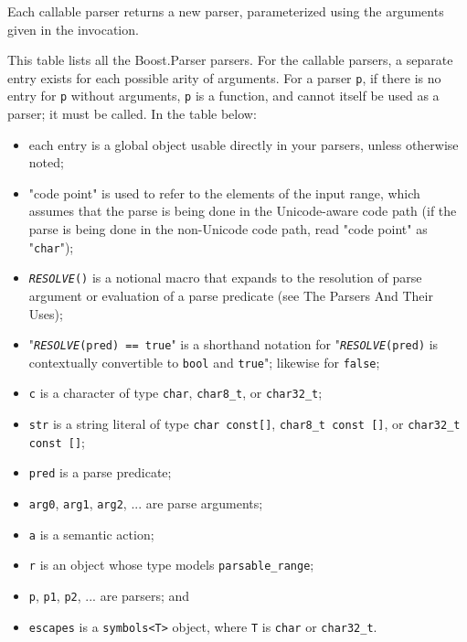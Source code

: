 Each callable parser returns a new parser, parameterized using the arguments given in the invocation.

This table lists all the Boost.Parser parsers. For the callable parsers, a separate entry exists for each possible arity of arguments. For a parser \texttt{p}, if there is no entry for \texttt{p} without arguments, \texttt{p} is a function, and cannot itself be used as a parser; it must be called. In the table below:

\begin{itemize}
\item
  each entry is a global object usable directly in your parsers, unless otherwise noted;
\item
  "code point" is used to refer to the elements of the input range, which assumes that the parse is being done in the Unicode-aware code path (if the parse is being done in the non-Unicode code path, read "code point" as "\texttt{char}");
\item
  \emph{\texttt{RESOLVE}}\texttt{()} is a notional macro that expands to the resolution of parse argument or evaluation of a parse predicate (see The Parsers And Their Uses);
\item
  "\emph{\texttt{RESOLVE}}\texttt{(pred) == true}" is a shorthand notation for "\emph{\texttt{RESOLVE}}\texttt{(pred)} is contextually convertible to \texttt{bool} and \texttt{true}"; likewise for \texttt{false};
\item
  \texttt{c} is a character of type \texttt{char}, \texttt{char8\_t}, or \texttt{char32\_t};
\item
  \texttt{str} is a string literal of type \texttt{char const{[}{]}}, \texttt{char8\_t const {[}{]}}, or \texttt{char32\_t const {[}{]}};
\item
  \texttt{pred} is a parse predicate;
\item
  \texttt{arg0}, \texttt{arg1}, \texttt{arg2}, ... are parse arguments;
\item
  \texttt{a} is a semantic action;
\item
  \texttt{r} is an object whose type models \texttt{parsable\_range};
\item
  \texttt{p}, \texttt{p1}, \texttt{p2}, ... are parsers; and
\item
  \texttt{escapes} is a \texttt{symbols<T>} object, where \texttt{T} is \texttt{char} or \texttt{char32\_t}.
\end{itemize}


